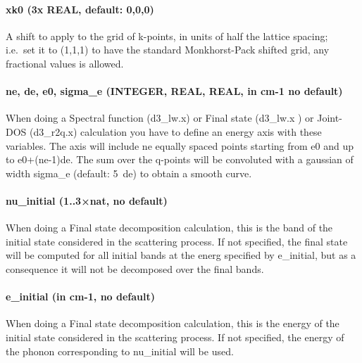 \documentclass[
]{article}
\begin{document}
\hypertarget{xk0-3x-real-default-000}{%
\paragraph{xk0 (3x REAL, default:
0,0,0)}\label{xk0-3x-real-default-000}}

A shift to apply to the grid of k-points, in units of half the lattice
spacing; i.e.~set it to (1,1,1) to have the standard Monkhorst-Pack
shifted grid, any fractional values is allowed.

\hypertarget{ne-de-e0-sigma_e-integer-real-real-in-cm-1-no-default-1}{%
\paragraph{ne, de, e0, sigma\_e (INTEGER, REAL, REAL, in cm-1 no
default)}\label{ne-de-e0-sigma_e-integer-real-real-in-cm-1-no-default-1}}

When doing a Spectral function (d3\_lw.x) or Final state (d3\_lw.x ) or
Joint-DOS (d3\_r2q.x) calculation you have to define an energy axis with
these variables. The axis will include ne equally spaced points starting
from e0 and up to e0+(ne-1)de. The sum over the q-points will be
convoluted with a gaussian of width sigma\_e (default: 5~de) to obtain a
smooth curve.

\hypertarget{nu_initial-1..3nat-no-default}{%
\paragraph{nu\_initial (1..3×nat, no
default)}\label{nu_initial-1..3nat-no-default}}

When doing a Final state decomposition calculation, this is the band of
the initial state considered in the scattering process. If not
specified, the final state will be computed for all initial bands at the
energ specified by e\_initial, but as a consequence it will not be
decomposed over the final bands.

\hypertarget{e_initial-in-cm-1-no-default}{%
\paragraph{e\_initial (in cm-1, no
default)}\label{e_initial-in-cm-1-no-default}}

When doing a Final state decomposition calculation, this is the energy
of the initial state considered in the scattering process. If not
specified, the energy of the phonon corresponding to nu\_initial will be
used.
\end{document}
